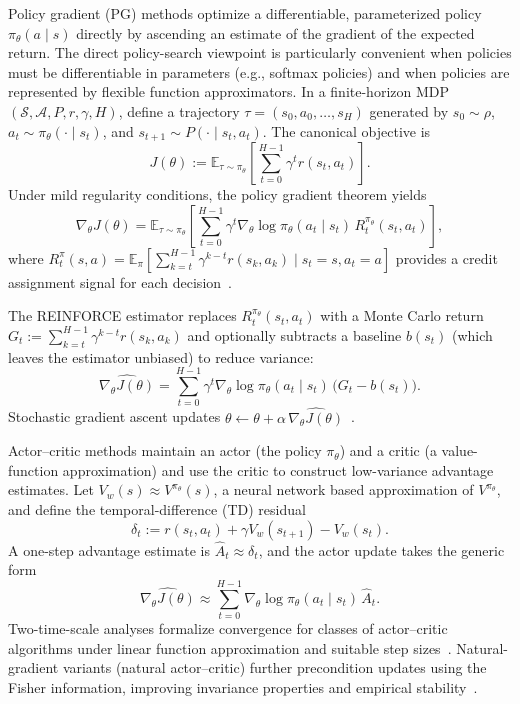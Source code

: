 \documentclass{article}
\numberwithin{equation}{section}
\newcommand{\E}{\mathbb E}
\newcommand{\cA}{\mathcal{A}}
\newcommand{\cS}{\mathcal{S}}
\begin{document}
Policy gradient (PG) methods optimize a differentiable, parameterized policy $\pi_\theta(a\mid s)$ directly by ascending an estimate of the gradient of the expected return. The direct policy-search viewpoint is particularly convenient when policies must be differentiable in parameters (e.g., softmax policies) and when policies are represented by flexible function approximators. In a finite-horizon MDP $(\cS,\cA,P,r,\gamma,H)$, define a trajectory $\tau=(s_0,a_0,\dots,s_H)$ generated by $s_0\sim \rho$, $a_t\sim\pi_\theta(\cdot\mid s_t)$, and $s_{t+1}\sim P(\cdot\mid s_t,a_t)$. The canonical objective is
\begin{equation}\label{eq:pg_objective}
J(\theta):=\E_{\tau\sim\pi_\theta}\left[\sum_{t=0}^{H-1}\gamma^t r(s_t,a_t)\right].
\end{equation}
Under mild regularity conditions, the policy gradient theorem yields
\begin{equation}\label{eq:policy_gradient_theorem}
\nabla_\theta J(\theta)
=
\E_{\tau\sim\pi_\theta}\left[\sum_{t=0}^{H-1}\gamma^t\nabla_\theta\log \pi_\theta(a_t\mid s_t)\,R_t^{\pi_\theta}(s_t,a_t)\right],
\end{equation}
where $R_t^{\pi}(s,a)=\E_{\pi}\!\left[\sum_{k=t}^{H-1}\gamma^{k-t}r(s_k,a_k)\mid s_t=s,a_t=a\right]$ provides a credit assignment signal for each decision~\cite{peters2008policygrad}.

The REINFORCE estimator replaces $R_t^{\pi_\theta}(s_t,a_t)$ with a Monte Carlo return $G_t:=\sum_{k=t}^{H-1}\gamma^{k-t}r(s_k,a_k)$ and optionally subtracts a baseline $b(s_t)$ (which leaves the estimator unbiased) to reduce variance:
\begin{equation}\label{eq:reinforce_estimator}
\widehat{\nabla_\theta J(\theta)}
=
\sum_{t=0}^{H-1}\gamma^t\nabla_\theta\log \pi_\theta(a_t\mid s_t)\,\big(G_t-b(s_t)\big).
\end{equation}
Stochastic gradient ascent updates $\theta\leftarrow\theta+\alpha\,\widehat{\nabla_\theta J(\theta)}$~\cite{williams1992reinforce}.

Actor--critic methods maintain an actor (the policy $\pi_\theta$) and a critic (a value-function approximation) and use the critic to construct low-variance advantage estimates. Let $V_w(s)\approx V^{\pi_\theta}(s)$, a neural network based approximation of $V^{\pi_\theta}$, and define the temporal-difference (TD) residual
\begin{equation}\label{eq:td_error}
\delta_t:=r(s_t,a_t)+\gamma V_w(s_{t+1})-V_w(s_t).
\end{equation}
A one-step advantage estimate is $\hat A_t\approx \delta_t$, and the actor update takes the generic form
\begin{equation}\label{eq:actor_update_adv}
\widehat{\nabla_\theta J(\theta)}\approx \sum_{t=0}^{H-1}\nabla_\theta\log\pi_\theta(a_t\mid s_t)\,\hat A_t.
\end{equation}
Two-time-scale analyses formalize convergence for classes of actor--critic algorithms under linear function approximation and suitable step sizes~\cite{konda2003actorcritic}.
Natural-gradient variants (natural actor--critic) further precondition updates using the Fisher information, improving invariance properties and empirical stability~\cite{peters2008naturalac}.
\end{document}
